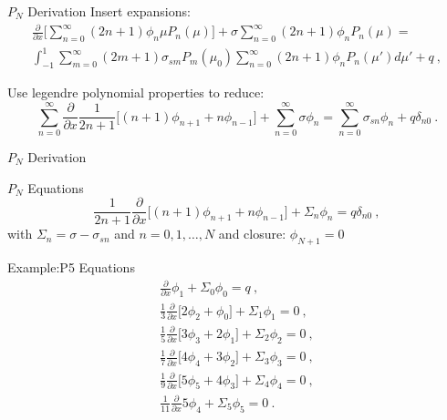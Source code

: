 \documentclass{beamer}
\begin{document}
\begin{frame}{$P_N$ Derivation}
  Insert expansions:
  \begin{multline}
    \frac{\partial}{\partial x}\Big[\sum_{n=0}^\infty (2n+1) \phi_n \mu
      P_n(\mu) \Big] + \sigma \sum_{n=0}^\infty (2n+1) \phi_n P_n(\mu) =
    \\ \int_{-1}^1 \sum_{m=0}^\infty (2m+1) \sigma_{sm} P_m(\mu_0)
    \sum_{n=0}^\infty (2n+1) \phi_n P_n(\mu') d \mu' + q\:,
    \label{eq:pn_deriv_1}
  \end{multline}

  Use legendre polynomial properties to reduce:
  \begin{equation}
    \sum_{n=0}^\infty \frac{\partial}{\partial x} \frac{1}{2n+1} \Big[
      (n+1) \phi_{n+1} + n \phi_{n-1} \Big] + \sum_{n=0}^\infty \sigma
    \phi_n = \sum_{n=0}^\infty \sigma_{sn} \phi_n + q\delta_{n0}\:.
    \label{eq:pn_deriv_18}
  \end{equation}

\end{frame}

\begin{frame}{$P_N$ Derivation}

  \begin{beamerboxesrounded}[upper=boxheadcolor,lower=boxbodycolor,shadow=true]
    {$P_N$ Equations}
    \begin{equation}
      \frac{1}{2n+1} \frac{\partial}{\partial x}\Big[ (n+1) \phi_{n+1} + n
        \phi_{n-1} \Big] + \Sigma_n \phi_n = q\delta_{n0} \:,
      \label{eq:final_pn_equations}
    \end{equation}
    with $\Sigma_n = \sigma-\sigma_{sn}$ and $n = 0,1,\dotsc,N$ and
    closure: $\phi_{N+1} = 0$
  \end{beamerboxesrounded}

  Example:P5 Equations
  {\small
    \begin{subequations}
      \begin{gather}
        \frac{\partial}{\partial x}\phi_{1} + \Sigma_0 \phi_0 = q\:,\\ 
        \frac{1}{3} \frac{\partial}{\partial x}\Big[ 2
          \phi_{2} + \phi_{0} \Big] + \Sigma_1 \phi_1 = 0\:,\\
        \frac{1}{5} \frac{\partial}{\partial x}\Big[ 3 \phi_{3} + 2
          \phi_{1} \Big] + \Sigma_2 \phi_2 = 0 \:,\\
        \frac{1}{7} \frac{\partial}{\partial x}\Big[ 4 \phi_{4} + 3
          \phi_{2} \Big] + \Sigma_3 \phi_3 = 0 \:,\\
        \frac{1}{9} \frac{\partial}{\partial x}\Big[ 5 \phi_{5} + 4
          \phi_{3} \Big] + \Sigma_4 \phi_4 = 0 \:,\\
        \frac{1}{11} \frac{\partial}{\partial x} 5 \phi_{4} + \Sigma_5
        \phi_5 = 0 \:.
      \end{gather}
      \label{eq:p5_equations}
    \end{subequations}
  }

\end{frame}
\end{document}
